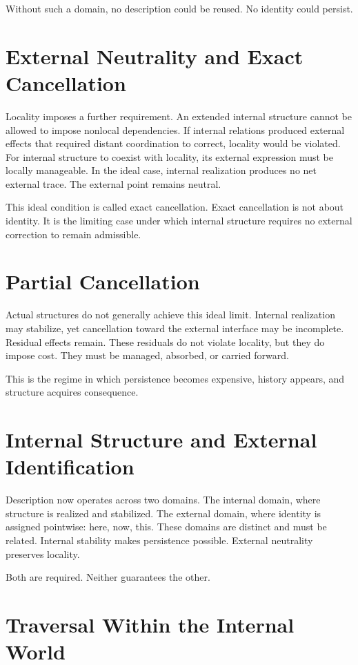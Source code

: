 \documentclass[11pt,twoside,openright]{book}
\begin{document}
Without such a domain, no description could be reused. No identity could persist.

\section*{External Neutrality and Exact Cancellation}

Locality imposes a further requirement. An extended internal structure cannot be allowed to impose nonlocal dependencies. If internal relations produced external effects that required distant coordination to correct, locality would be violated. For internal structure to coexist with locality, its external expression must be locally manageable. In the ideal case, internal realization produces no net external trace. The external point remains neutral.

This ideal condition is called exact cancellation. Exact cancellation is not about identity. It is the limiting case under which internal structure requires no external correction to remain admissible.

\section*{Partial Cancellation}

Actual structures do not generally achieve this ideal limit. Internal realization may stabilize, yet cancellation toward the external interface may be incomplete. Residual effects remain. These residuals do not violate locality, but they do impose cost. They must be managed, absorbed, or carried forward.

This is the regime
in which persistence
becomes expensive,
history appears,
and structure
acquires consequence.
\section*{Internal Structure and External Identification}

Description now operates across two domains. The internal domain, where structure is realized and stabilized. The external domain, where identity is assigned pointwise: here, now, this. These domains are distinct and must be related. Internal stability makes persistence possible. External neutrality preserves locality.

Both are required.
Neither guarantees the other.
\section*{Traversal Within the Internal World}
\end{document}

